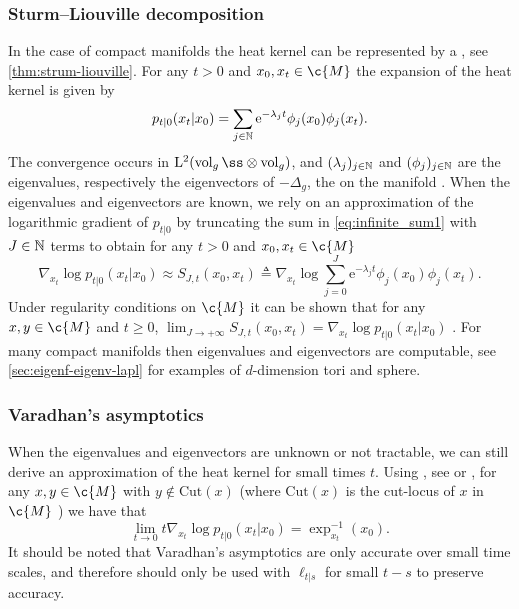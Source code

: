 \subsubsection{Sturm--Liouville decomposition}
In the case of compact manifolds the heat kernel can be represented by a , see \cref{thm:strum-liouville}. 
For any \(t > 0\) and \(x_0, x_t \in \c{M}\) the expansion of the heat kernel is given by \[ \label{eq:infinite_sum1} {p_{t|0}(x_t|x_0) = \sum_{j \in \mathbb{N}} \mathrm{e}^{-\lambda_j t} \phi_j(x_0)\phi_j(x_t)}.\]
The convergence occurs in \(\mathrm{L}^2(\vol_g ß\otimes \vol_g)\), and \((\lambda_j)_{j \in \mathbb{N}}\) and \((\phi_j)_{j \in \mathbb{N}}\) are the eigenvalues, respectively the eigenvectors of \(-\Delta_g\), the  on the manifold \cite[Section 2]{saloff1994precise}.
When the eigenvalues and eigenvectors are known, we rely on an approximation of the logarithmic gradient of \(p_{t|0}\) by truncating the sum in \cref{eq:infinite_sum1} with \(J \in \mathbb{N}\) terms to obtain for any \(t > 0\) and \(x_0,x_t \in \c{M}\) \[ \label{eq:heat_kernel_trunc} \nabla_{x_t} \log p_{t|0}(x_t|x_0) \approx {S_{J,t}(x_0,x_t) \triangleq \nabla_{x_t} \log {\sum_{j=0}^J \mathrm{e}^{-\lambda_j t} \phi_j(x_0)\phi_j(x_t)} .
	}
\]
Under regularity conditions on \(\c{M}\) it can be shown that for any \(x,y \in \c{M}\) and \(t \geq 0\), \(\lim_{J \to +\infty} S_{J,t}(x_0,x_t) = \nabla_{x_t} \log p_{t|0}(x_t|x_0)\) \cite[Lemma 1]{jones2008Manifold}.
For many compact manifolds then eigenvalues and eigenvectors are computable, see \cref{sec:eigenf-eigenv-lapl} for examples of \(d\)-dimension tori and sphere.

\subsubsection{Varadhan's asymptotics}
When the eigenvalues and eigenvectors are unknown or not tractable, we can still derive an approximation of the heat kernel for small times \(t\).
Using , see \textcite[Theorem 3.8]{bismut1984large} or \textcite[Theorem 2.1]{chen2021logarithmic}, for any \(x, y \in \c{M}\) with \(y \notin \mathrm{Cut}(x)\) (where \(\mathrm{Cut}(x)\) is the cut-locus of \(x\) in \(\c{M}\) \cite[Chapter 10]{lee2018introduction}) we have that \begin{equation} \label{eq:varadhan} \textstyle{\lim_{t \to 0} t \nabla_{x_t} \log p_{t|0}(x_t|x_0) = \exp^{-1}_{x_t}(x_0) .
	}
\end{equation}
It should be noted that Varadhan's asymptotics are only accurate over small time scales, and therefore should only be used with \(\ell_{t|s}\) for small \(t-s\) to preserve accuracy.

